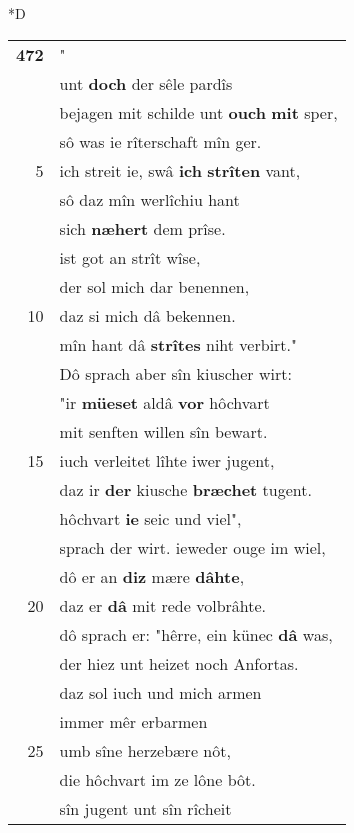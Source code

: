 \documentclass[8pt,a4paper,notitlepage]{article}
\begin{document}
\begin{table}[ht]
\begin{minipage}[t]{0.5\linewidth}
\small
\begin{center}*D
\end{center}
\begin{tabular}{rl}
\textbf{472} & "\textbf{\begin{large}M\end{large}ac} rîterschaft des lîbes prîs\\ 
 & unt \textbf{doch} der sêle pardîs\\ 
 & bejagen mit schilde unt \textbf{ouch} \textbf{mit} sper,\\ 
 & sô was ie rîterschaft mîn ger.\\ 
5 & ich streit ie, swâ \textbf{ich} \textbf{strîten} vant,\\ 
 & sô daz mîn werlîchiu hant\\ 
 & sich \textbf{næhert} dem prîse.\\ 
 & ist got an strît wîse,\\ 
 & der sol mich dar benennen,\\ 
10 & daz si mich dâ bekennen.\\ 
 & mîn hant dâ \textbf{strîtes} niht verbirt."\\ 
 & Dô sprach aber sîn kiuscher wirt:\\ 
 & "ir \textbf{müeset} aldâ \textbf{vor} hôchvart\\ 
 & mit senften willen sîn bewart.\\ 
15 & iuch verleitet lîhte iwer jugent,\\ 
 & daz ir \textbf{der} kiusche \textbf{bræchet} tugent.\\ 
 & hôchvart \textbf{ie} seic und viel",\\ 
 & sprach der wirt. ieweder ouge im wiel,\\ 
 & dô er an \textbf{diz} mære \textbf{dâhte},\\ 
20 & daz er \textbf{dâ} mit rede volbrâhte.\\ 
 & dô sprach er: "hêrre, ein künec \textbf{dâ} was,\\ 
 & der hiez unt heizet noch Anfortas.\\ 
 & daz sol iuch und mich armen\\ 
 & immer mêr erbarmen\\ 
25 & umb sîne herzebære nôt,\\ 
 & die hôchvart im ze lône bôt.\\ 
 & sîn jugent unt sîn rîcheit\\ 

\end{tabular}
\end{minipage}
\end{table}
\end{document}
